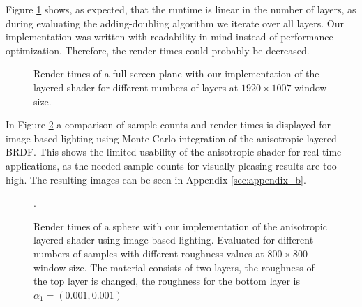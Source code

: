 Figure \ref{fig:performance_layers} shows, as expected, that the runtime is linear in the number of layers, as during evaluating the adding-doubling algorithm we iterate over all layers. Our implementation was written with readability in mind instead of performance optimization. Therefore, the render times could probably be decreased.

\begin{figure}[!h]
    
    \caption{Render times of a full-screen plane with our implementation of the layered shader for different numbers of layers at $1920\times1007$ window size.}
    \label{fig:performance_layers}
\end{figure}

%

In Figure \ref{fig:performance_ibl} a comparison of sample counts and render times is displayed for image based lighting using Monte Carlo integration of the anisotropic layered BRDF. This shows the limited usability of the anisotropic shader for real-time applications, as the needed sample counts for visually pleasing results are too high. The resulting images can be seen in Appendix \ref{sec:appendix_b}. 

\begin{figure}[!h]
    
    \caption{Render times of a sphere with our implementation of the anisotropic layered shader using image based lighting. Evaluated for different numbers of samples with different roughness values at $800\times800$ window size. The material consists of two layers, the roughness of the top layer is changed, the roughness for the bottom layer is $\alpha_1=(0.001,0.001)$}.
    \label{fig:performance_ibl}
\end{figure}

